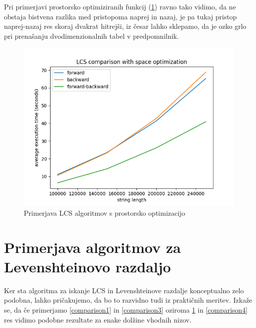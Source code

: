 \documentclass[a4paper,12pt,openright]{book}
\begin{document}
Pri primerjavi prostorsko optimiziranih funkcij (\ref{comparison2}) ravno tako vidimo, da ne obstaja bistvena razlika med pristopoma naprej in nazaj, je pa tukaj pristop naprej-nazaj res skoraj dvakrat hitrejši, iz česar lahko sklepamo, da je ozko grlo pri prenašanju dvodimenzionalnih tabel v predpomnilnik. 

\begin{figure}[htb]
\begin{center}
\includegraphics[width=1.0\textwidth]{plots/LCS_comparison_space.png}
\end{center}
\caption{Primerjava LCS algoritmov s prostorsko optimizacijo}
\label{comparison2}
\end{figure}






\section{Primerjava algoritmov za Levenshteinovo razdaljo}

Ker sta algoritma za iskanje LCS in Levenshteinove razdalje konceptualno zelo podobna, lahko pričakujemo, da bo to razvidno tudi iz praktičnih meritev. Izkaže se, da če primerjamo \ref{comparison1} in \ref{comparison3} oziroma \ref{comparison2} in \ref{comparison4} res vidimo podobne rezultate za enake dolžine vhodnih nizov. 
\end{document}
